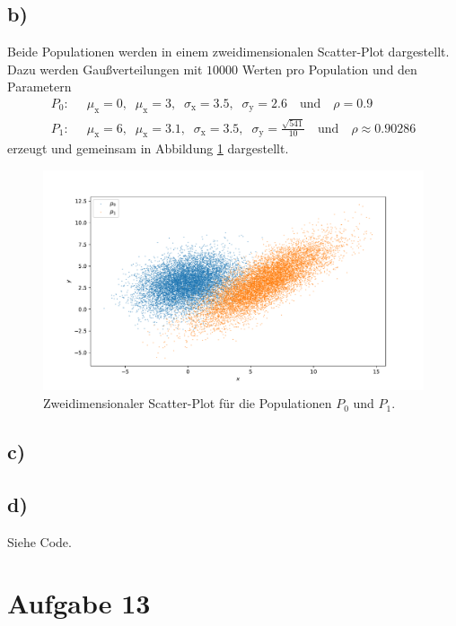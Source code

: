 \documentclass[a4paper, 11pt]{article}
\begin{document}
\subsection*{b)}
Beide Populationen werden in einem zweidimensionalen Scatter-Plot dargestellt.
Dazu werden Gaußverteilungen mit $10000$ Werten pro Population und den Parametern
\begin{align*}
  P_0:\;\; &\mu_\text{x} = 0,\;\; \mu_\text{x} = 3,\;\; \sigma_\text{x}=3.5,\;\;
   \sigma_\text{y}=2.6 \quad \text{und} \quad \rho=0.9 \\
  P_1:\;\; &\mu_\text{x} = 6,\;\; \mu_\text{x} = 3.1,\;\; \sigma_\text{x}=3.5,\;\;
  \sigma_\text{y}= \frac{\sqrt{541}}{10} \quad \text{und} \quad \rho\approx 0.90286
\end{align*}
erzeugt und gemeinsam in Abbildung \ref{fig:populationen} dargestellt.
\begin{figure}[H]
  \centering
  \includegraphics[width=\textwidth]{../A12/A12b.pdf}
  \caption{Zweidimensionaler Scatter-Plot für die Populationen $P_0$ und $P_1$.}
  \label{fig:populationen}
\end{figure}

\subsection*{c)}

\subsection*{d)}
Siehe Code.



\FloatBarrier

\section*{Aufgabe 13}
\end{document}
